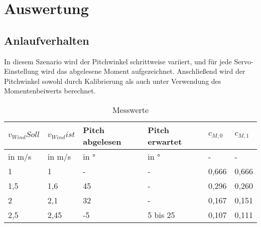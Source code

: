 \section{Auswertung}
\label{sec:Auswertung}
\subsection{Anlaufverhalten}
In diesem Szenario wird der Pitchwinkel schrittweise variiert, und für jede Servo-Einstellung  wird das abgelesene Moment aufgezeichnet. Anschließend wird der Pitchwinkel sowohl durch Kalibrierung als auch unter Verwendung des Momentenbeiwerts berechnet.
\begin{table}[ht!]
    \centering
    \caption{Messwerte}
    \label{tab_Messwerte_Anlauf_230615}
    \begin{tabular}{|l|l|l|l|l|l|}
        \hline
        \rowcolor[HTML]{70AD47} 
        {\color[HTML]{FFFFFF} \textbf{$v_{Wind} Soll$}} & {\color[HTML]{FFFFFF} \textbf{$v_{Wind} ist$}} & {\color[HTML]{FFFFFF} \textbf{Pitch abgelesen}} & {\color[HTML]{FFFFFF} \textbf{Pitch erwartet}} & {\color[HTML]{FFFFFF} \textbf{$c_{M,0}$}} & {\color[HTML]{FFFFFF} \textbf{$c_{M,1}$}} \\ \hline
        \rowcolor[HTML]{70AD47} 
        in m/s                                         & in m/s                                      & in °                                            & in °                                           & -                                      & -                                      \\ \hline
        \rowcolor[HTML]{E2EFDA} 
        1                                              & 1                                           & -                                               & -                                              & 0,666                                  & 0,666                                  \\ \hline
        \rowcolor[HTML]{C6E0B4} 
        1,5                                            & 1,6                                         & 45                                              & -                                              & 0,296                                  & 0,260                                  \\ \hline
        \rowcolor[HTML]{E2EFDA} 
        2                                              & 2,1                                         & 32                                              & -                                              & 0,167                                  & 0,151                                  \\ \hline
        \rowcolor[HTML]{C6E0B4} 
        2,5                                            & 2,45                                        & -5                                              & 5 bis 25                                       & 0,107                                  & 0,111                                  \\ \hline
    \end{tabular}
\end{table}


